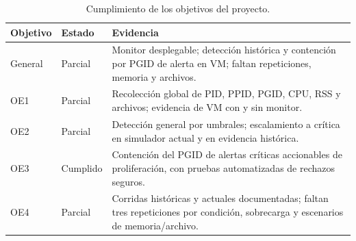 \begin{table}[H]
  \centering
  \caption{Cumplimiento de los objetivos del proyecto.}
  \label{tab:cumplimiento-objetivos}
  \small
  \begin{tabular}{p{}p{}p{}}
    \toprule
    Objetivo & Estado & Evidencia \\
    \midrule
    General & Parcial & Monitor desplegable; detección histórica y contención por PGID de alerta en VM; faltan repeticiones, memoria y archivos. \\
    OE1 & Parcial & Recolección global de PID, PPID, PGID, CPU, RSS y archivos; evidencia de VM con y sin monitor. \\
    OE2 & Parcial & Detección general por umbrales; escalamiento a crítica en simulador actual y en evidencia histórica. \\
    OE3 & Cumplido & Contención del PGID de alertas críticas accionables de proliferación, con pruebas automatizadas de rechazos seguros. \\
    OE4 & Parcial & Corridas históricas y actuales documentadas; faltan tres repeticiones por condición, sobrecarga y escenarios de memoria/archivo. \\
    \bottomrule
  \end{tabular}
\end{table}
